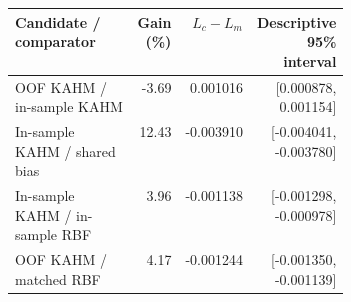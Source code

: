 \begin{tabular}{@{}p{0.39\linewidth}rrr@{}}
\toprule
Candidate / comparator & Gain (\%) & $L_c-L_m$ & Descriptive 95\% interval \\
\midrule
OOF KAHM / in-sample KAHM & -3.69 & 0.001016 & [0.000878, 0.001154] \\
In-sample KAHM / shared bias & 12.43 & -0.003910 & [-0.004041, -0.003780] \\
In-sample KAHM / in-sample RBF & 3.96 & -0.001138 & [-0.001298, -0.000978] \\
OOF KAHM / matched RBF & 4.17 & -0.001244 & [-0.001350, -0.001139] \\
\bottomrule
\end{tabular}
